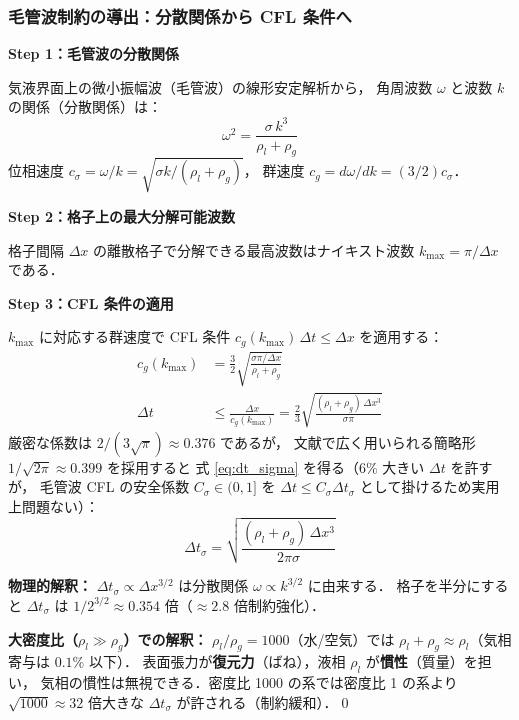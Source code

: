 \subsubsection{毛管波制約の導出：分散関係から CFL 条件へ}
\label{app:capillary_cfl}

\textbf{Step 1：毛管波の分散関係}

気液界面上の微小振幅波（毛管波）の線形安定解析から，
角周波数 $\omega$ と波数 $k$ の関係（分散関係）は：
\begin{equation}
  \omega^2 = \frac{\sigma\,k^3}{\rho_l + \rho_g}
  \label{eq:capillary_dispersion_app}
\end{equation}
位相速度 $c_\sigma = \omega/k = \sqrt{\sigma k/(\rho_l+\rho_g)}$，
群速度 $c_g = d\omega/dk = (3/2)c_\sigma$．

\textbf{Step 2：格子上の最大分解可能波数}

格子間隔 $\Delta x$ の離散格子で分解できる最高波数はナイキスト波数
$k_{\max} = \pi/\Delta x$ である．

\textbf{Step 3：CFL 条件の適用}

$k_{\max}$ に対応する群速度で CFL 条件 $c_g(k_{\max})\,\Delta t \le \Delta x$ を適用する：
\begin{align*}
  c_g(k_{\max}) &= \frac{3}{2}\sqrt{\frac{\sigma\pi/\Delta x}{\rho_l+\rho_g}} \\
  \Delta t &\le \frac{\Delta x}{c_g(k_{\max})}
  = \frac{2}{3}\sqrt{\frac{(\rho_l+\rho_g)\,\Delta x^3}{\sigma\pi}}
\end{align*}
厳密な係数は $2/(3\sqrt{\pi}) \approx 0.376$ であるが，
文献で広く用いられる簡略形 $1/\sqrt{2\pi} \approx 0.399$ を採用すると
式 \eqref{eq:dt_sigma} を得る（$6\%$ 大きい $\Delta t$ を許すが，
毛管波 CFL の安全係数 $C_\sigma \in (0,1]$ を
$\Delta t \le C_\sigma\Delta t_\sigma$ として掛けるため実用上問題ない）：
\[
  \Delta t_\sigma = \sqrt{\frac{(\rho_l+\rho_g)\,\Delta x^3}{2\pi\sigma}}
\]

\textbf{物理的解釈：} $\Delta t_\sigma \propto \Delta x^{3/2}$ は分散関係 $\omega \propto k^{3/2}$ に由来する．
格子を半分にすると $\Delta t_\sigma$ は $1/2^{3/2} \approx 0.354$ 倍（$\approx 2.8$ 倍制約強化）．

\medskip
\textbf{大密度比（$\rho_l \gg \rho_g$）での解釈：}
$\rho_l/\rho_g = 1000$（水/空気）では $\rho_l + \rho_g \approx \rho_l$（気相寄与は $0.1\%$ 以下）．
表面張力が\textbf{復元力}（ばね），液相 $\rho_l$ が\textbf{慣性}（質量）を担い，
気相の慣性は無視できる．密度比 1000 の系では密度比 1 の系より
$\sqrt{1000} \approx 32$ 倍大きな $\Delta t_\sigma$ が許される（制約緩和）．\qed

